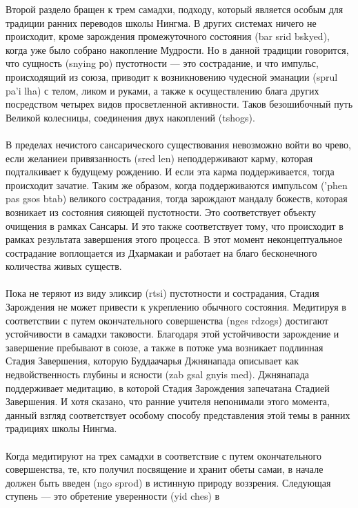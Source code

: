 \begin{siderules}
Второй раздело бращен к трем самадхи, подходу, который является особым для традиции
ранних переводов школы Нингма. В других системах ничего не происходит, кроме
зарождения промежуточного состояния (bar srid bskyed), когда уже было собрано накопление
Мудрости. Но в данной традиции говорится, что сущность (snying ро) пустотности — это
сострадание, и что импульс, происходящий из союза, приводит к возникновению чудес\-ной
эманации (sprul pa'i lha) с телом, ликом и руками, а также к осуществлению блага других
посредством четырех видов просветленной активности. Таков безошибочный путь Великой
колесницы, соединения двух накоплений (tshogs).\\
\\
В пределах нечистого сансарического существования невозможно войти во чрево, если
желаниеи привязанность (sred len) неподдерживают карму, которая подталкивает к
будущему рождению. И если эта карма поддерживается, тогда происходит зачатие. Таким же
образом, когда поддерживаются импульсом ('phen pas gsos btab) великого сострадания, тогда
зарождают мандалу божеств, которая возникает из состояния сияющей пустотности. Это
соответ\-ствует объекту очищения в рамках Сансары. И это также соответствует тому, что
происходит в рамках результата завершения этого процесса. В этот момент
неконцептуаль\-ное сострадание воплощается из Дхармакаи и работает на благо бесконечного
количества живых существ.\\
\\
Пока не теряют из виду эликсир (rtsi) пустотности и сострадания, Стадия Зарождения не
может привести к укреплению обычного состояния. Медитируя в соответ\-ствии с путем
окончательного совершенства (nges rdzogs) достигают устойчивости в самадхи таковости.
Благодаря этой устойчивости зарождение и завершение пребывают в союзе, а также в потоке
ума возникает подлинная Стадия Завершения, которую Буддаачарья Джнянапада описывает
как недвойственность глубины и ясности (zab gsal gnyis med). Джнянапада поддерживает
медитацию, в которой Стадия Зарождения запечатана Стадией Заверше\-ния. И хотя сказано,
что ранние учителя непонимали этого момента, данный взгляд соответствует особому
способу представления этой темы в ранних традициях школы Нингма.\\
\\
Когда медитируют на трех самадхи в соответствие с путем окончательного совершенства, те,
кто получил посвящение и хранит обеты самаи, в начале должен быть введен (ngo sprod) в
истинную природу воззрения. Следующая ступень — это обретение уверенности (yid ches) в

\end{siderules}

